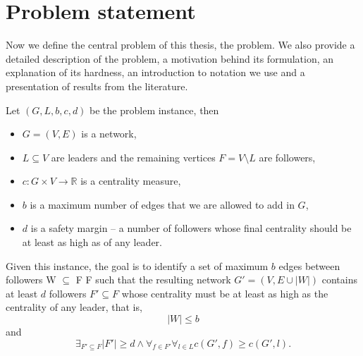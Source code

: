 \chapter{Problem statement}\label{chapter:ProblemStatement}

Now we define the central problem of this thesis, the \HL problem.
We also provide a detailed description of the problem, a motivation behind its formulation,
an explanation of its hardness, an introduction to notation we use and a presentation of results from the literature. 

\vspace{2.5mm}
\begin{tcolorbox}[
    enhanced, skin=enhancedmiddle,
    arc=0pt, outer arc=0pt,
    frame hidden, %
    colback=backgroundgray!10,
    boxsep=0mm,
    borderline={0.75mm}{0mm}{decoration}, borderline={0.75mm}{0.75mm}{backgroundgray},
]
\begin{definition}[\HL]\label{def:HL}
    Let $(G, L, b, c, d)$ be the problem instance, then
    \begin{itemize}
        \item $G = (V, E)$ is a network,
        \item $L \subseteq V$ are leaders and the remaining vertices $F = V \setminus L$ are followers,
        \item $c : G \times V \rightarrow \mathbb{R}$ is a centrality measure,
        \item $b$ is a maximum number of edges that we are allowed to add in $G$,
        \item $d$ is a safety margin -- a number of followers whose final centrality should be at least as high as of any leader.
    \end{itemize}
    Given this instance, the goal is to identify a set of maximum $b$ edges between followers W $\subseteq$ F {\texttimes} F
    such that the resulting network $G' = (V, E \cup |W|)$ contains at least $d$ followers $F' \subseteq F$
    whose centrality must be at least as high as the centrality of any leader, that is,
    $$|W| \leq b$$
    and
    $$\exists_{F' \subseteq F} |F'| \geq d \wedge \forall_{f \in F'} \forall_{l \in L} c(G', f) \geq c(G', l).$$
\end{definition}
\end{tcolorbox}
\vspace{2.5mm}

